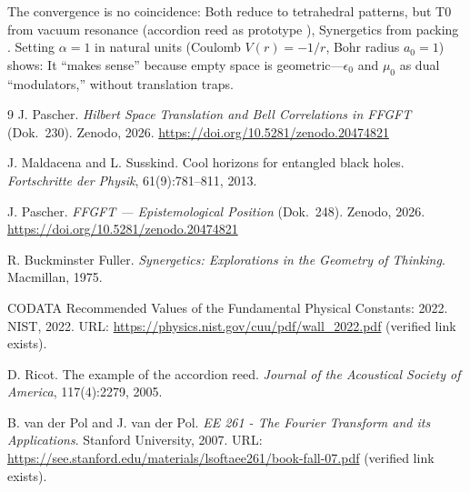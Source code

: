 	The convergence is no coincidence: Both reduce to tetrahedral patterns, but T0 from vacuum resonance (accordion reed as prototype \cite{ricot2005}), Synergetics from packing \cite{fuller1975}. Setting $\alpha=1$ in natural units (Coulomb $V(r) = -1/r$, Bohr radius $a_0 = 1$) shows: It ``makes sense'' because empty space is geometric—$\epsilon_0$ and $\mu_0$ as dual ``modulators,'' without translation traps.
	
	\begin{thebibliography}{9}
	J. Pascher.
	\newblock \emph{Hilbert Space Translation and Bell Correlations in FFGFT} (Dok.~230).
	\newblock Zenodo, 2026.
	\newblock \url{https://doi.org/10.5281/zenodo.20474821}

	J. Maldacena and L. Susskind.
	\newblock Cool horizons for entangled black holes.
	\newblock \emph{Fortschritte der Physik}, 61(9):781--811, 2013.

	J. Pascher.
	\newblock \emph{FFGFT --- Epistemological Position} (Dok.~248).
	\newblock Zenodo, 2026.
	\newblock \url{https://doi.org/10.5281/zenodo.20474821}

		R. Buckminster Fuller.
		\newblock \emph{Synergetics: Explorations in the Geometry of Thinking}.
		\newblock Macmillan, 1975.
		
		CODATA Recommended Values of the Fundamental Physical Constants: 2022.
		\newblock NIST, 2022.
		\newblock URL: \url{https://physics.nist.gov/cuu/pdf/wall_2022.pdf}
		(verified link exists).
		
		D. Ricot.
		\newblock The example of the accordion reed.
		\newblock \emph{Journal of the Acoustical Society of America}, 117(4):2279, 2005.
		
		B. van der Pol and J. van der Pol.
		\newblock \emph{EE 261 - The Fourier Transform and its Applications}.
		\newblock Stanford University, 2007.
		\newblock URL: \url{https://see.stanford.edu/materials/lsoftaee261/book-fall-07.pdf}
		(verified link exists).
	\end{thebibliography}
